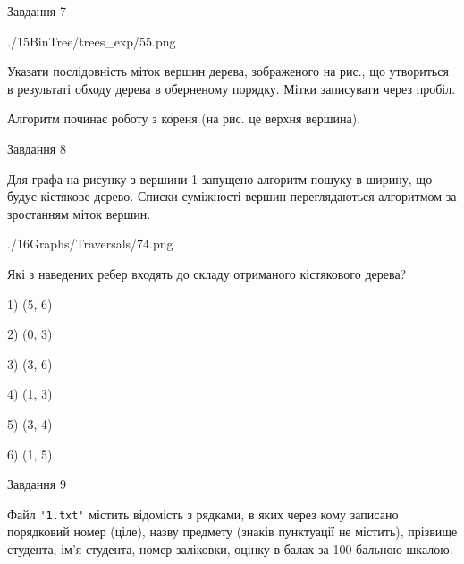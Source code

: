 \documentclass[12pt, ukrainian]{article}
\def\code#1{\Verb!#1!}
\begin{document}
{\vspace{10mm}\par

\newpage
\begin{minipage}[t]{9.7cm}
               
{\begin{center}Завдання {7}\end{center}}
\vspace{-6mm}

\begin{center}
	{./15BinTree/trees_exp/55.png}
\end{center}
Указати послідовність міток вершин дерева, зображеного на рис., що утвориться в результаті обходу дерева в оберненому порядку. Мітки записувати через пробіл.\par Алгоритм починає роботу з кореня (на рис. це верхня вершина).\par

\end{minipage}
\vline \hspace{8mm}
\begin{minipage}[t]{8.0cm}
               
{\begin{center}Завдання {8}\end{center}}
\vspace{-6mm}
Для графа на рисунку з вершини 1 запущено алгоритм пошуку в ширину, що будує кістякове дерево. Списки суміжності вершин переглядаються алгоритмом за зростанням міток вершин.\par
\begin{center}
	{./16Graphs/Traversals/74.png}
\end{center}
\par Які з наведених ребер входять до складу отриманого кістякового дерева?\par
1) (5, 6)\par
2) (0, 3)\par
3) (3, 6)\par
4) (1, 3)\par
5) (3, 4)\par
6) (1, 5)\par
{\vskip 15pt} \par

\end{minipage}

               
{\begin{center}Завдання {9}\end{center}}
\vspace{-6mm}
Файл \code{'1.txt'} містить відомість з рядками, в яких через кому записано поряд\-ковий номер (ціле), назву предмету (знаків пунктуації не містить), прізвище студента, ім'я студента, номер заліковки, оцінку в балах за 100 бальною шкалою.

}
\end{document}
